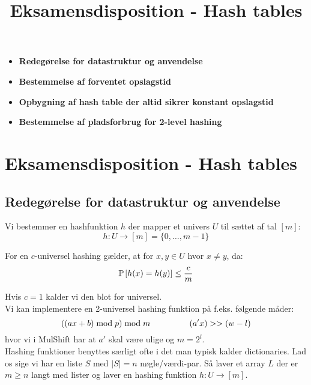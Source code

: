 
\title{Eksamensdisposition - Hash tables}


\maketitle

\begin{itemize}
  \item \textbf{Redegørelse for datastruktur og anvendelse}
  \item \textbf{Bestemmelse af forventet opslagstid}
  \item \textbf{Opbygning af hash table der altid sikrer konstant opslagstid}
  \item \textbf{Bestemmelse af pladsforbrug for 2-level hashing}
\end{itemize}


\newpage
\section{Eksamensdisposition - Hash tables}
\subsection{Redegørelse for datastruktur og anvendelse}
Vi bestemmer en hashfunktion $h$ der mapper et univers $U$ til sættet af tal $[m]$:
$$
  h : U \rightarrow [m] = \{0, \dots, m-1 \}
$$

For en $c$-universel hashing gælder, at for $x, y \in U$ hvor $x \neq y$, da:
$$
\P{h(x) = h(y)} \leq \frac{c}{m}
$$

Hvis $c = 1$ kalder vi den blot for universel.\\

Vi kan implementere en 2-universel hashing funktion på f.eks. følgende måder:
$$
  ((ax + b) \bmod p) \bmod m
  \longspace
  (a' x) >> (w-l)
$$
hvor vi i MulShift har at $a'$ skal være ulige og $m = 2^l$.\\

Hashing funktioner benyttes særligt ofte i det man typisk kalder dictionaries. Lad os sige vi har en liste $S$ med $|S| = n$ nøgle/værdi-par. Så laver et array $L$ der er $m \geq n$ langt med lister og laver en hashing funktion $h : U \rightarrow [m]$.

